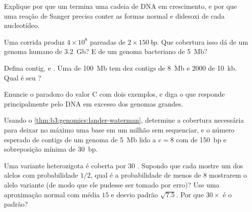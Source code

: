 \begin{exercise}[$\star$]\label{exo:b3:genomics:1}
Explique por que um  termina uma cadeia de DNA em
crescimento, e por que uma reação de Sanger precisa conter as formas
normal e didesoxi de cada nucleotídeo.
\end{exercise}

\begin{exercise}[$\star$]\label{exo:b3:genomics:2}
Uma corrida produz $4\times 10^{8}$  pareadas de
$2\times \qty{150}{bp}$. Que cobertura isso dá de um genoma humano de
\qty{3.2}{Gb}? E de um genoma bacteriano de \qty{5}{Mb}?
\end{exercise}

\begin{exercise}[$\star$]\label{exo:b3:genomics:3}
Defina contig,  e . Uma  de \qty{100}{Mb} tem dez
contigs de \qty{8}{Mb} e \num{2000} de \qty{10}{kb}. Qual é seu ?
\end{exercise}

\begin{exercise}[$\star$]\label{exo:b3:genomics:4}
Enuncie o paradoxo do valor C com dois exemplos, e diga o que responde
principalmente pelo DNA em excesso dos genomas grandes.
\end{exercise}

\begin{exercise}[$\star\star$]\label{exo:b3:genomics:5}
Usando o \cref{thm:b3:genomics:lander-waterman}, determine a cobertura
necessária para deixar no máximo uma base em um milhão sem sequenciar,
e o número esperado de contigs de um genoma de \qty{5}{Mb} lido a
$c = 8$ com  de \qty{150}{bp} e sobreposição mínima de
\qty{30}{bp}.
\end{exercise}

\begin{exercise}[$\star\star$]\label{exo:b3:genomics:6}
Uma variante heterozigota é coberta por $30$ . Supondo que
cada  mostre um dos alelos com probabilidade $1/2$, qual é a
probabilidade de menos de $8$  mostrarem o alelo variante (de
modo que ele pudesse ser tomado por erro)? Use uma aproximação normal
com média $15$ e desvio padrão $\sqrt{7.5}$. Por que $30\times$ é o
padrão?
\end{exercise}

